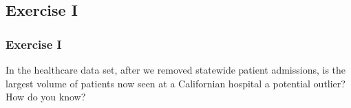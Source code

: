 


\subsection{Exercise I}
\begin{frame}
	\frametitle{Exercise I}
	In the healthcare data set, after we removed statewide patient admissions, is the largest volume of patients now seen at a Californian hospital a potential outlier?  How do you know?
\end{frame}